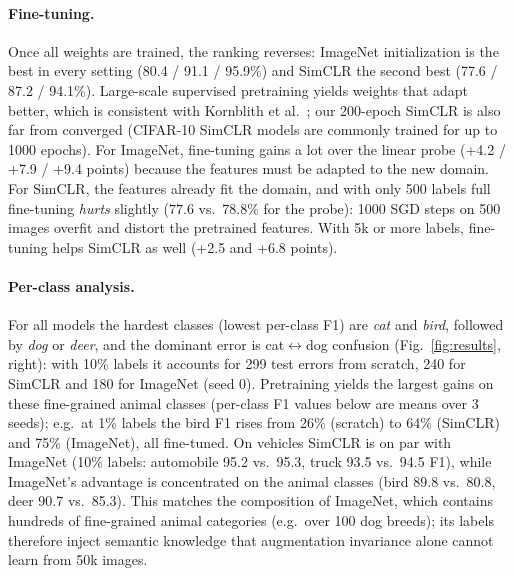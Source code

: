 \documentclass[10pt,a4paper]{article}
\begin{document}
\paragraph{Fine-tuning.} Once all weights are trained, the ranking reverses: ImageNet
initialization is the best in every setting (80.4 / 91.1 / 95.9\%) and SimCLR the second best
(77.6 / 87.2 / 94.1\%). Large-scale supervised pretraining yields weights that adapt better,
which is consistent with Kornblith et al.~\cite{kornblith}; our 200-epoch SimCLR is also far from
converged (CIFAR-10 SimCLR models are commonly trained for up to 1000 epochs). For ImageNet,
fine-tuning gains a lot over the linear probe (+4.2 / +7.9 / +9.4 points) because the features must
be adapted to the new domain. For SimCLR, the features already fit the domain, and with only 500
labels full fine-tuning \emph{hurts} slightly ($77.6$ vs.\ $78.8$\% for the probe): 1000 SGD steps on
500 images overfit and distort the pretrained features. With 5k or more labels, fine-tuning helps
SimCLR as well (+2.5 and +6.8 points).

\paragraph{Per-class analysis.} For all models the hardest classes (lowest per-class F1) are \emph{cat}
and \emph{bird}, followed by \emph{dog} or \emph{deer}, and the dominant error is cat$\leftrightarrow$dog confusion
(Fig.~\ref{fig:results}, right): with 10\% labels it accounts for 299 test errors from scratch,
240 for SimCLR and 180 for ImageNet (seed 0). Pretraining yields the largest gains on these
fine-grained animal classes (per-class F1 values below are means over 3 seeds); e.g.\ at 1\% labels the bird F1 rises from 26\% (scratch) to 64\%
(SimCLR) and 75\% (ImageNet), all fine-tuned. On vehicles SimCLR is on par with ImageNet (10\% labels: automobile
95.2 vs.\ 95.3, truck 93.5 vs.\ 94.5 F1), while ImageNet's advantage is concentrated on the animal
classes (bird 89.8 vs.\ 80.8, deer 90.7 vs.\ 85.3). This matches the composition of ImageNet, which
contains hundreds of fine-grained animal categories (e.g.\ over 100 dog breeds); its labels
therefore inject semantic knowledge that augmentation invariance alone cannot learn from 50k
images.

\end{document}
